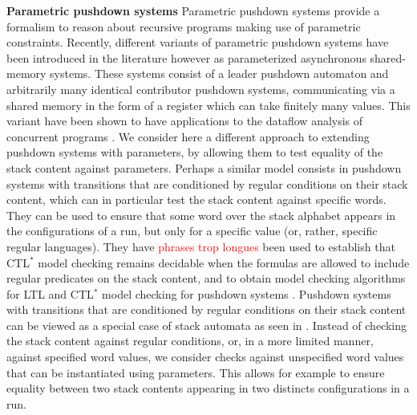 \documentclass[a4paper,UKenglish,cleveref, autoref, thm-restate]{lipics-v2021}
\begin{document}
{\bf Parametric pushdown systems}
 Parametric pushdown systems provide a  formalism to
reason about 
recursive programs
making use of parametric constraints.
Recently, different variants of parametric pushdown systems have been introduced in the literature 
\cite{hague2011parameterised, esparza2016parameterized, fortin2017model} 
however as
parameterized asynchronous shared-memory systems.
These systems consist of a leader pushdown automaton
and arbitrarily many identical contributor pushdown systems, communicating via a shared memory
in the form of a register which can take finitely many values.
This variant have been shown to have applications
to the dataflow analysis of concurrent programs \cite{kahlon2008parameterization}. 
We consider here a different approach to extending pushdown systems with parameters, by allowing them to test equality of the stack content against parameters.
Perhaps a similar model consists in 
pushdown systems 
with transitions that are conditioned by regular conditions on their stack content, which
can in particular
test the
stack content against
specific words. 
They can be used to ensure that some word over the stack alphabet appears in the configurations of a run, but only for a specific value (or, rather, specific regular languages).
They have \textcolor{red}{ phrases trop longues}
been used to establish that CTL$^*$ model checking remains decidable
when the formulas are allowed to include regular predicates on the stack content,
and to obtain 
model checking algorithms for LTL and CTL$^*$ model checking
for
pushdown systems \cite{finkel1997direct}.
Pushdown systems 
with transitions that are conditioned by regular conditions on their stack content
can be viewed as
a special case of stack automata as seen in \cite{hopcroft1969formal}.
Instead
of checking the stack content against regular conditions, or, in a more limited manner,
against specified word values,
we consider
checks against unspecified word values that can be instantiated using parameters.
This allows for example to ensure equality between two stack contents appearing in two distincts configurations in a run.
\end{document}
